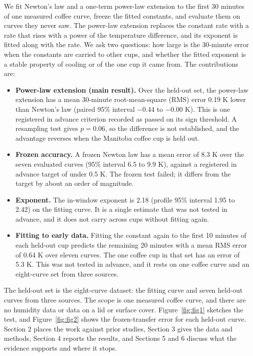 \documentclass[11pt,letterpaper]{article}
\begin{document}
We fit Newton's law and a one-term power-law extension to the first 30 minutes of one measured coffee curve, freeze the fitted constants, and evaluate them on curves they never saw. The power-law extension replaces the constant rate with a rate that rises with a power of the temperature difference, and its exponent is fitted along with the rate. We ask two questions: how large is the 30-minute error when the constants are carried to other cups, and whether the fitted exponent is a stable property of cooling or of the one cup it came from. The contributions are:

\begin{itemize}
  \item \textbf{Power-law extension (main result).} Over the held-out set, the power-law extension has a mean 30-minute root-mean-square (RMS) error 0.19 K lower than Newton's law (paired 95\% interval $-$0.44 to $-$0.00 K). This is one registered in advance criterion recorded as passed on its sign threshold. A resampling test gives $p = 0.06$, so the difference is not established, and the advantage reverses when the Manitoba coffee cup is held out.
  \item \textbf{Frozen accuracy.} A frozen Newton law has a mean error of 8.3 K over the seven evaluated curves (95\% interval 6.5 to 9.9 K), against a registered in advance target of under 0.5 K. The frozen test failed; it differs from the target by about an order of magnitude.
  \item \textbf{Exponent.} The in-window exponent is 2.18 (profile 95\% interval 1.95 to 2.42) on the fitting curve. It is a single estimate that was not tested in advance, and it does not carry across cups without fitting again.
  \item \textbf{Fitting to early data.} Fitting the constant again to the first 10 minutes of each held-out cup predicts the remaining 20 minutes with a mean RMS error of 0.64 K over eleven curves. The one coffee cup in that set has an error of 5.3 K. This was not tested in advance, and it rests on one coffee curve and an eight-curve set from three sources.
\end{itemize}

The held-out set is the eight-curve dataset: the fitting curve and seven held-out curves from three sources. The scope is one measured coffee curve, and there are no humidity data or data on a lid or surface cover. Figure~\ref{fig:fig1} sketches the test, and Figure~\ref{fig:fig2} shows the frozen-transfer error for each held-out curve. Section 2 places the work against prior studies, Section 3 gives the data and methods, Section 4 reports the results, and Sections 5 and 6 discuss what the evidence supports and where it stops.
\end{document}

